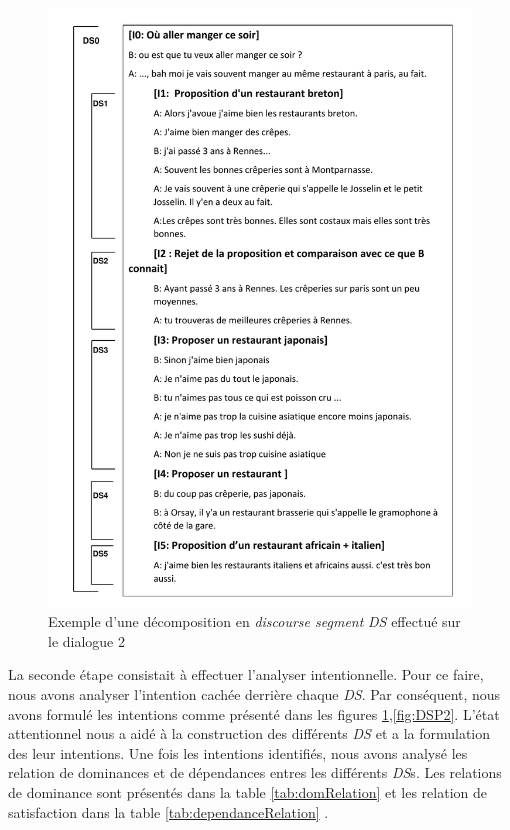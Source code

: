 \begin{figure}[!h]
	\includegraphics[width=5in]{Figures/dsp_analysis.pdf}
	\caption{\label{fig:DSP} Exemple d'une décomposition en \emph{discourse segment} \emph{DS} effectué sur le dialogue 2}
\end{figure} 

La seconde étape consistait à effectuer l'analyser intentionnelle. Pour ce faire, nous avons analyser l'intention cachée derrière chaque \emph{DS}. Par conséquent, nous avons formulé les intentions comme présenté dans les figures \ref{fig:DSP},\ref{fig:DSP2}.  L'état attentionnel nous a aidé à la construction des différents \emph{DS} et a la formulation des leur intentions.	
Une fois les intentions identifiés, nous avons analysé les relation de dominances et de dépendances entres les différents \emph{DS}s. Les relations de dominance sont présentés dans la table \ref{tab:domRelation} et les relation de satisfaction dans la table \ref{tab:dependanceRelation} .


